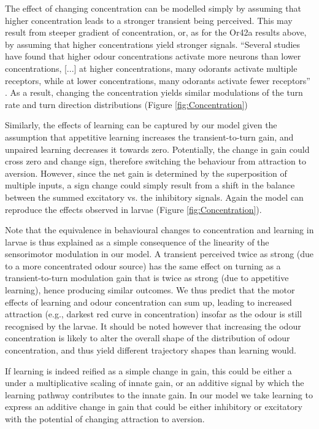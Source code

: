 \documentclass[11pt,a4paper]{article}
\begin{document}
The effect of changing concentration can be modelled simply by assuming that higher concentration leads to a stronger transient being perceived. This may result from steeper gradient of concentration, or, as for the Or42a results above, by assuming that higher concentrations yield stronger signals.  “Several studies have found that higher odour concentrations activate more neurons than lower concentrations, [...] at higher concentrations, many odorants activate multiple receptors, while at lower concentrations, many odorants activate fewer receptors” \citep{hallem2006coding}.
 As a result, changing the concentration yields similar modulations of the turn rate and turn direction distributions (Figure \ref{fig:Concentration})

Similarly, the effects of learning can be captured by our model given the assumption that appetitive learning increases the transient-to-turn gain, and unpaired learning decreases it towards zero. Potentially, the change in gain could cross zero and change sign, therefore switching the behaviour from attraction to aversion. However, since the net gain is determined by the superposition of multiple inputs, a sign change could simply result from a shift in the balance between the summed excitatory vs. the inhibitory signals. Again the model can reproduce the effects observed in larvae (Figure \ref{fig:Concentration}). 

Note that the equivalence in behavioural changes to concentration and learning in larvae is thus explained as a simple consequence of the linearity of the sensorimotor modulation in our model. A transient perceived twice as strong (due to a more concentrated odour source) has the same effect on turning as a transient-to-turn modulation gain that is twice as strong (due to appetitive learning), hence producing similar outcomes. We thus predict that the motor effects of learning and odour concentration can sum up, leading to increased attraction (e.g., darkest red curve in concentration) insofar as the odour is still recognised by the larvae. It should be noted however that increasing the odour concentration is likely to alter the overall shape of the distribution of odour concentration, and thus yield different trajectory shapes than learning would.


If learning is indeed reified as a simple change in gain, this could be either a under a multiplicative scaling of innate gain, or an additive signal by which the learning pathway contributes to the innate gain. In our model we take learning to express an additive change in gain that could be either inhibitory or excitatory with the potential of changing attraction to aversion.
\end{document}
